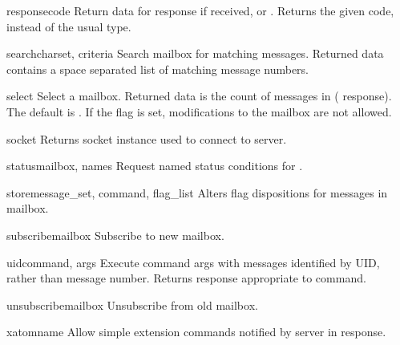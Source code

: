 \begin{methoddesc}{response}{code}
  Return data for response  if received, or
  . Returns the given code, instead of the usual type.
\end{methoddesc}

\begin{methoddesc}{search}{charset, criteria}
  Search mailbox for matching messages. Returned data contains a space
  separated list of matching message numbers.
\end{methoddesc}

\begin{methoddesc}{select}{}
  Select a mailbox. Returned data is the count of messages in
   ( response).  The default 
  is .  If the  flag is set, modifications
  to the mailbox are not allowed.
\end{methoddesc}

\begin{methoddesc}{socket}{}
  Returns socket instance used to connect to server. 
\end{methoddesc}

\begin{methoddesc}{status}{mailbox, names}
  Request named status conditions for . 
\end{methoddesc}

\begin{methoddesc}{store}{message_set, command, flag_list}
  Alters flag dispositions for messages in mailbox.
\end{methoddesc}

\begin{methoddesc}{subscribe}{mailbox}
  Subscribe to new mailbox.
\end{methoddesc}

\begin{methoddesc}{uid}{command, args}
  Execute command args with messages identified by UID, rather than
  message number. Returns response appropriate to command.
\end{methoddesc}

\begin{methoddesc}{unsubscribe}{mailbox}
  Unsubscribe from old mailbox.
\end{methoddesc}

\begin{methoddesc}{xatom}{name}
  Allow simple extension commands notified by server in
   response.
\end{methoddesc}


